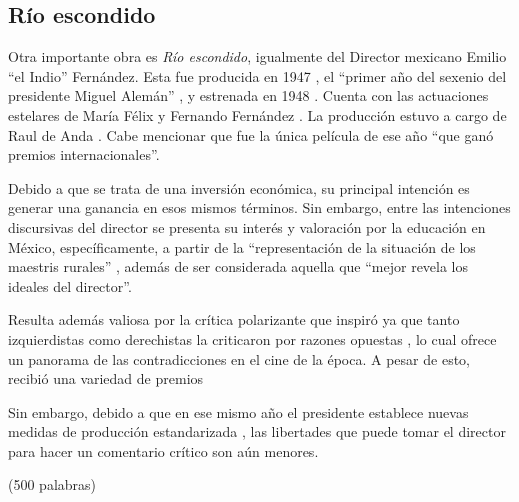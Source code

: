 
\subsection{Río escondido}
Otra importante obra es \textit{Río escondido}, igualmente del Director mexicano Emilio ``el Indio'' Fernández. Esta fue producida en 1947\autocite[143]{garcia_riera_historia_1993} 
, el ``primer año del sexenio del presidente Miguel Alemán''\autocite[105]{garcia_riera_historia_1993}
, y estrenada en 1948\autocite[144]{garcia_riera_historia_1993}
. Cuenta con las actuaciones estelares de María Félix y Fernando Fernández\autocite[143]{garcia_riera_historia_1993} 
. La producción estuvo a cargo de Raul de Anda\autocite[143]{garcia_riera_historia_1993} 
. Cabe mencionar que fue la única película de ese año ``que ganó premios internacionales''\autocite[108-109]{garcia_riera_historia_1993}.

Debido a que se trata de una inversión económica, su principal intención es generar una ganancia en esos mismos términos. Sin embargo, entre las intenciones discursivas del director se presenta su interés y valoración por la educación en México, específicamente, a partir de la ``representación  de la situación de los maestris rurales''\autocite[72]{tierney_myths_2002}
, además de ser considerada aquella que ``mejor revela los ideales del director''\autocite[171]{mora_mexican_1978-2}.

Resulta además valiosa por la crítica polarizante que inspiró\autocite[170-171]{mora_mexican_1978-2}
ya que tanto izquierdistas como derechistas la criticaron por razones opuestas\autocite[144]{garcia_riera_historia_1993}
, lo cual ofrece un panorama de las contradicciones en el cine de la época.
A pesar de esto, recibió una variedad de premios\autocite[108-109]{garcia_riera_historia_1993}

Sin embargo, debido a que en ese mismo año el presidente establece nuevas medidas de producción estandarizada\autocite[105]{garcia_riera_historia_1993}
, las libertades que puede tomar el director para hacer un comentario crítico son aún menores.

(500 palabras)
\pagebreak
